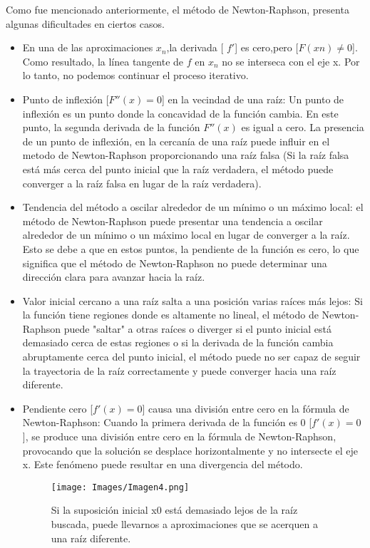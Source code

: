 \documentclass[conference]{IEEEtran}
\begin{document}
Como fue mencionado anteriormente, el método de Newton-Raphson, presenta algunas dificultades en ciertos casos.

\begin{itemize}

    \item En una de las aproximaciones  $x_n$,la derivada [ $f'$]
        es cero,pero  [$F(xn)  \neq 0$]. Como resultado, la línea tangente de  $f$ en  $x_n$ no se interseca con el eje  x. Por lo tanto, no podemos continuar el proceso iterativo.

	
	\item Punto de inflexión [$F''(x) = 0$] en la vecindad de una raíz:
        Un punto de inflexión es un punto donde la concavidad de la función cambia. En este punto, la segunda derivada de la función $F''(x)$ es igual a cero.
	      La presencia de un punto de inflexión, en la cercanía de una raíz puede influir en el metodo de Newton-Raphson proporcionando una raíz falsa (Si la raíz falsa está más cerca del punto inicial que la raíz verdadera, el método puede converger a la raíz falsa en lugar de la raíz verdadera).

	\item Tendencia del método a oscilar alrededor de un mínimo o un
	      máximo local:
	      el método de Newton-Raphson puede presentar una tendencia a oscilar alrededor de un mínimo o un máximo local en lugar de converger a la raíz. Esto se debe a que en estos puntos, la pendiente de la función es cero, lo que significa que el método de Newton-Raphson no puede determinar una dirección clara para avanzar hacia la raíz.



	\item Valor inicial cercano a una raíz salta a una posición varias
	      raíces más lejos:
	      Si la función tiene regiones donde es altamente no lineal, el método de Newton-Raphson puede "saltar" a otras raíces o diverger si el punto inicial está demasiado cerca de estas regiones o si la derivada de la función cambia abruptamente cerca del punto inicial, el método puede no ser capaz de seguir la trayectoria de la raíz correctamente y puede converger hacia una raíz diferente.

	\item Pendiente cero [$f'(x) = 0$] causa una división entre cero
	      en la fórmula de Newton-Raphson:
	      Cuando la primera derivada de la función es 0 [$f'(x) = 0$], se
	      produce una división entre cero en la fórmula de Newton-Raphson,
	      provocando que la solución se desplace horizontalmente y no
	      intersecte el eje x. Este fenómeno puede resultar en una
	      divergencia del método.
       
        \begin{figure} [h]
            \centering
            \texttt{[image: Images/Imagen4.png]}
            \caption{Si la suposición inicial  x0
  está demasiado lejos de la raíz buscada, puede llevarnos a aproximaciones que se acerquen a una raíz diferente.}
            \label{fig:fig4}
       \end{figure}
\end{itemize}
\end{document}
